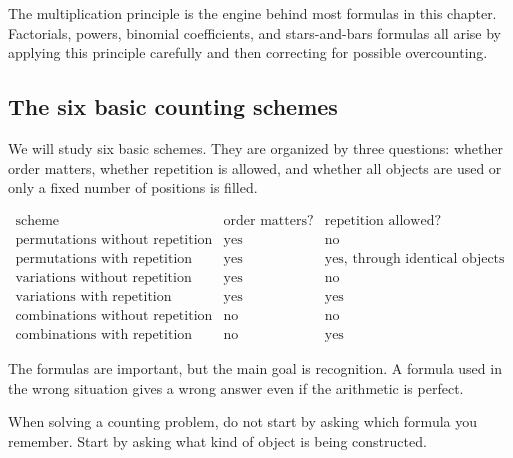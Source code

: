The multiplication principle is the engine behind most formulas in this chapter. Factorials, powers, binomial coefficients, and stars-and-bars formulas all arise by applying this principle carefully and then correcting for possible overcounting.

\subsection*{The six basic counting schemes}

We will study six basic schemes. They are organized by three questions: whether order matters, whether repetition is allowed, and whether all objects are used or only a fixed number of positions is filled.

\[
\begin{array}{c|c|c}
\text{scheme} & \text{order matters?} & \text{repetition allowed?} \\
\hline
\text{permutations without repetition} & \text{yes} & \text{no} \\
\text{permutations with repetition} & \text{yes} & \text{yes, through identical objects} \\
\text{variations without repetition} & \text{yes} & \text{no} \\
\text{variations with repetition} & \text{yes} & \text{yes} \\
\text{combinations without repetition} & \text{no} & \text{no} \\
\text{combinations with repetition} & \text{no} & \text{yes}
\end{array}
\]

The formulas are important, but the main goal is recognition. A formula used in the wrong situation gives a wrong answer even if the arithmetic is perfect.

\begin{remarkbox}
When solving a counting problem, do not start by asking which formula you remember. Start by asking what kind of object is being constructed.
\end{remarkbox}








